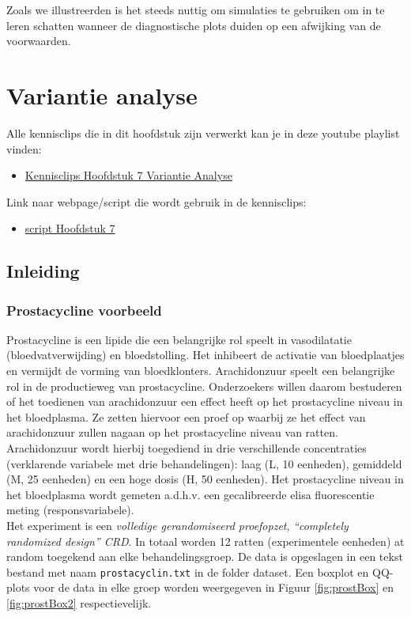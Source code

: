 \documentclass[
  12pt,dutch,coursenotes]{book}
\providecommand{\tightlist}{%
  \setlength{\itemsep}{0pt}\setlength{\parskip}{0pt}}
\theoremstyle{definition}
\theoremstyle{definition}
\theoremstyle{definition}
\theoremstyle{remark}
\begin{document}
Zoals we illustreerden is het steeds nuttig om simulaties te gebruiken om in te leren schatten wanneer de diagnostische plots duiden op een afwijking van de voorwaarden.

\hypertarget{chap:anova}{%
\chapter{Variantie analyse}\label{chap:anova}}

Alle kennisclips die in dit hoofdstuk zijn verwerkt kan je in deze youtube playlist vinden:

\begin{itemize}
\tightlist
\item
  \href{https://www.youtube.com/playlist?list=PLZH1hP8_LbJIBVGNQ61zxMgc2srezPpnB}{Kennisclips Hoofdstuk 7 Variantie Analyse}
\end{itemize}

Link naar webpage/script die wordt gebruik in de kennisclips:

\begin{itemize}
\tightlist
\item
  \href{https://statomics.github.io/sbc20/rmd/07-Anova.html}{script Hoofdstuk 7}
\end{itemize}

\hypertarget{inleiding-6}{%
\section{Inleiding}\label{inleiding-6}}

\hypertarget{prostacycline-voorbeeld}{%
\subsection{Prostacycline voorbeeld}\label{prostacycline-voorbeeld}}

Prostacycline is een lipide die een belangrijke rol speelt in vasodilatatie (bloedvatverwijding) en bloedstolling.
Het inhibeert de activatie van bloedplaatjes en vermijdt de vorming van bloedklonters.
Arachidonzuur speelt een belangrijke rol in de productieweg van prostacycline.
Onderzoekers willen daarom bestuderen of het toedienen van arachidonzuur een effect heeft op het prostacycline niveau in het bloedplasma.
Ze zetten hiervoor een proef op waarbij ze het effect van arachidonzuur zullen nagaan op het prostacycline niveau van ratten.
Arachidonzuur wordt hierbij toegediend in drie verschillende concentraties (verklarende variabele met drie behandelingen): laag (L, 10 eenheden), gemiddeld (M, 25 eenheden) en een hoge dosis (H, 50 eenheden).
Het prostacycline niveau in het bloedplasma wordt gemeten a.d.h.v. een gecalibreerde elisa fluorescentie meting (responsvariabele).\\
Het experiment is een \emph{volledige gerandomiseerd proefopzet}, \emph{``completely randomized design'' CRD}. In totaal worden 12 ratten (experimentele eenheden) at random toegekend aan elke behandelingsgroep.
De data is opgeslagen in een tekst bestand met naam \texttt{prostacyclin.txt} in de folder dataset.
Een boxplot en QQ-plots voor de data in elke groep worden weergegeven in Figuur \ref{fig:prostBox} en \ref{fig:prostBox2} respectievelijk.
\end{document}
